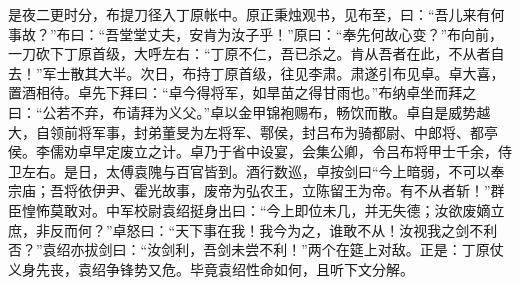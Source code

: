 是夜二更时分，布提刀径入丁原帐中。原正秉烛观书，见布至，曰：“吾儿来有何事故？”布曰：“吾堂堂丈夫，安肯为汝子乎！”原曰：“奉先何故心变？”布向前，一刀砍下丁原首级，大呼左右：“丁原不仁，吾已杀之。肯从吾者在此，不从者自去！”军士散其大半。次日，布持丁原首级，往见李肃。肃遂引布见卓。卓大喜，置酒相待。卓先下拜曰：“卓今得将军，如旱苗之得甘雨也。”布纳卓坐而拜之曰：“公若不弃，布请拜为义父。”卓以金甲锦袍赐布，畅饮而散。卓自是威势越大，自领前将军事，封弟董旻为左将军、鄠侯，封吕布为骑都尉、中郎将、都亭侯。李儒劝卓早定废立之计。卓乃于省中设宴，会集公卿，令吕布将甲士千余，侍卫左右。是日，太傅袁隗与百官皆到。酒行数巡，卓按剑曰“今上暗弱，不可以奉宗庙；吾将依伊尹、霍光故事，废帝为弘农王，立陈留王为帝。有不从者斩！”群臣惶怖莫敢对。中军校尉袁绍挺身出曰：“今上即位未几，并无失德；汝欲废嫡立庶，非反而何？”卓怒曰：“天下事在我！我今为之，谁敢不从！汝视我之剑不利否？”袁绍亦拔剑曰：“汝剑利，吾剑未尝不利！”两个在筵上对敌。正是：丁原仗义身先丧，袁绍争锋势又危。毕竟袁绍性命如何，且听下文分解。